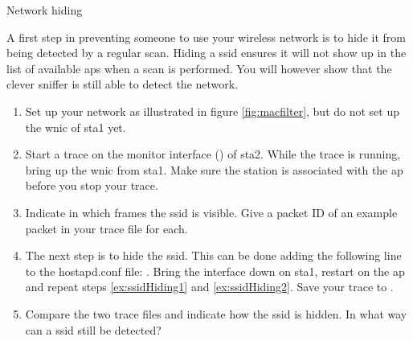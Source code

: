 \begin{exercise}{Network hiding}

A first step in preventing someone to use your wireless network is to hide it from being detected by a regular scan. Hiding a \ac{ssid} ensures it will not show up in the list of available \acp{ap} when a scan is performed. You will however show that the clever sniffer is still able to detect the network.

\begin{enumerate}
	\item Set up your network as illustrated in figure \ref{fig:macfilter}, but do not set up the \ac{wnic} of \ac{sta}1 yet. \label{ex:ssidHiding1}
	\item Start a trace on the monitor interface () of \ac{sta}2. While the trace is running, bring up the \ac{wnic} from \ac{sta}1. \label{ex:ssidHiding2} Make sure the station is associated with the \ac{ap} before you stop your trace.
	\item Indicate in which frames the \ac{ssid} is visible. Give a packet ID of an example packet in your trace file for each.\newline
	\begin{esolution}
	\end{esolution} 
	\item The next step is to hide the \ac{ssid}. This can be done adding the following line to the hostapd.conf file: . Bring the interface down on \ac{sta}1, restart  on the \ac{ap} and repeat steps \ref{ex:ssidHiding1} and \ref{ex:ssidHiding2}. Save your trace to .
	\item Compare the two trace files and indicate how the \ac{ssid} is hidden. In what way can a \ac{ssid} still be detected?\newline
	\begin{esolution}
	\end{esolution}
\end{enumerate}

\end{exercise}

